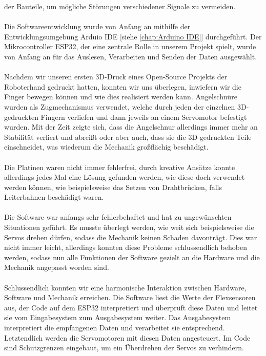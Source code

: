 \documentclass[titlepage,12pt,twoside]{article}
\begin{document}
der Bauteile, um mögliche Störungen verschiedener Signale zu vermeiden. \\
\\
Die Softwareentwicklung wurde von Anfang an mithilfe der Entwicklungsumgebung Arduio IDE
[siehe \textcolor{blue}{\autoref{chap:Arduino IDE}}] durchgeführt. Der Mikrocontroller ESP32, der eine zentrale Rolle 
in unserem Projekt spielt, wurde von Anfang an für das Auslesen, Verarbeiten 
und Senden der Daten ausgewählt. \\
\\
Nachdem wir unseren ersten 3D-Druck eines Open-Source Projekts der Roboterhand 
gedruckt hatten, konnten wir uns überlegen, inwiefern wir die Finger bewegen 
können und wie dies realisiert werden kann. Angelschnüre wurden als Zugmechanismus 
verwendet, welche durch jeden der einzelnen 3D-gedruckten Fingern verliefen 
und dann jeweils an einem Servomotor befestigt wurden. Mit der Zeit zeigte 
sich, dass die Angelschnur allerdings immer mehr an Stabilität verliert und 
abreißt oder aber auch, dass sie die 3D-gedruckten Teile einschneidet, was 
wiederum die Mechanik großflächig beschädigt. \\
\\
Die Platinen waren nicht immer fehlerfrei, durch kreative Ansätze konnte 
allerdings jedes Mal eine Lösung gefunden werden, wie diese doch verwendet 
werden können, wie beispielsweise das Setzen von Drahtbrücken, falls 
Leiterbahnen beschädigt waren. \\
\\
Die Software war anfangs sehr fehlerbehaftet und hat zu ungewünschten 
Situationen geführt. Es musste überlegt werden, wie weit sich beispielsweise 
die Servos drehen dürfen, sodass die Mechanik keinen Schaden davonträgt. Dies 
war nicht immer leicht, allerdings konnten diese Probleme schlussendlich 
behoben werden, sodass nun alle Funktionen der Software gezielt an die Hardware 
und die Mechanik angepasst worden sind. \\
\\
Schlussendlich konnten wir eine harmonische Interaktion zwischen Hardware, 
Software und Mechanik erreichen. Die Software liest die Werte der Flexsensoren 
aus, der Code auf dem ESP32 interpretiert und überprüft diese Daten und leitet 
sie vom Eingabesystem zum Ausgabesystem weiter. Das Ausgabesystem interpretiert 
die empfangenen Daten und verarbeitet sie entsprechend. Letztendlich werden 
die Servomotoren mit diesen Daten angesteuert. Im Code sind Schutzgrenzen eingebaut, 
um ein Überdrehen der Servos zu verhindern. \\
\end{document}
